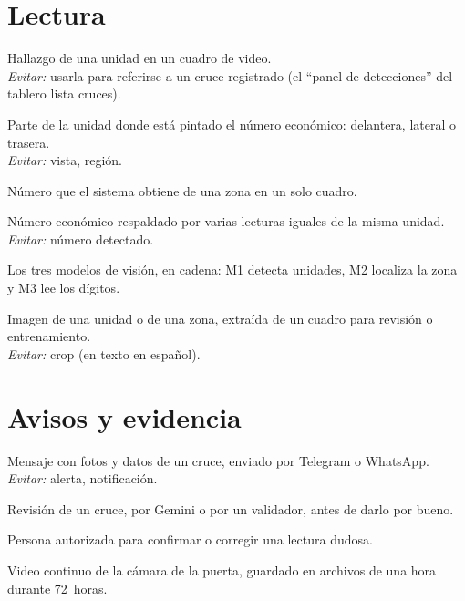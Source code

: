 \section{Lectura}

\begin{description}[style=nextline]
  \item[Detección] Hallazgo de una unidad en un cuadro de video.\\
        \emph{Evitar:} usarla para referirse a un cruce registrado (el
        ``panel de detecciones'' del tablero lista cruces).
  \item[Zona] Parte de la unidad donde está pintado el número económico:
        delantera, lateral o trasera.\\
        \emph{Evitar:} vista, región.
  \item[Lectura] Número que el sistema obtiene de una zona en un solo
        cuadro.
  \item[Número confirmado] Número económico respaldado por varias lecturas
        iguales de la misma unidad.\\
        \emph{Evitar:} número detectado.
  \item[M1, M2, M3] Los tres modelos de visión, en cadena: M1 detecta
        unidades, M2 localiza la zona y M3 lee los dígitos.
  \item[Recorte] Imagen de una unidad o de una zona, extraída de un cuadro
        para revisión o entrenamiento.\\
        \emph{Evitar:} crop (en texto en español).
\end{description}

\section{Avisos y evidencia}

\begin{description}[style=nextline]
  \item[Aviso] Mensaje con fotos y datos de un cruce, enviado por Telegram
        o WhatsApp.\\
        \emph{Evitar:} alerta, notificación.
  \item[Validación] Revisión de un cruce, por Gemini o por un validador,
        antes de darlo por bueno.
  \item[Validador] Persona autorizada para confirmar o corregir una lectura
        dudosa.
  \item[Grabación] Video continuo de la cámara de la puerta, guardado en
        archivos de una hora durante 72~horas.
\end{description}
